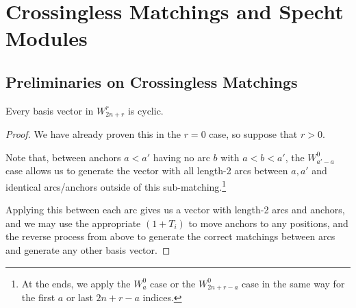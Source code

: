 \documentclass{amsart}
\begin{document}
\section{Crossingless Matchings and Specht Modules}
\subsection{Preliminaries on Crossingless Matchings}
\begin{lemma}
  \label{Cyclic}
  Every basis vector in $W_{2n + r}^r$ is cyclic.
\end{lemma}
\begin{proof}
  We have already proven this in the $r = 0$ case, so suppose that $r > 0$.

    Note that, between anchors $a<a'$ having no arc $b$ with $a < b < a'$, the $W_{a'-a}^0$ case allows us to generate the vector with all length-2 arcs between $a,a'$ and identical arcs/anchors outside of this sub-matching.\footnote{At the ends, we apply the $W_a^0$ case or the $W_{2n + r - a}^{0}$ case in the same way for the first $a$ or last $2n + r - a$ indices.}

  Applying this between each arc gives us a vector with length-2 arcs and anchors, and we may use the appropriate $(1+T_i)$ to move anchors to any positions, and the reverse process from above to generate the correct matchings between arcs and generate any other basis vector.
\end{proof}
\end{document}
